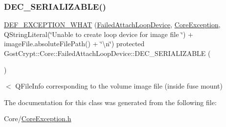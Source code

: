 \subsubsection{\texorpdfstring{D\+E\+C\+\_\+\+S\+E\+R\+I\+A\+L\+I\+Z\+A\+B\+L\+E()}{DEC\_SERIALIZABLE()}}
{\footnotesize\ttfamily \hyperlink{_gost_crypt_exception_8h_a5bc1e1c6c9d6f46c84eeba49e33355f9}{D\+E\+F\+\_\+\+E\+X\+C\+E\+P\+T\+I\+O\+N\+\_\+\+W\+H\+AT} (\hyperlink{class_gost_crypt_1_1_core_1_1_failed_attach_loop_device}{Failed\+Attach\+Loop\+Device}, \hyperlink{class_gost_crypt_1_1_core_1_1_core_exception}{Core\+Exception}, Q\+String\+Literal(\char`\"{}Unable to create loop device for image file \char`\"{}) + image\+File.\+absolute\+File\+Path() + \char`\"{}\textbackslash{}n\char`\"{}) protected Gost\+Crypt\+::\+Core\+::\+Failed\+Attach\+Loop\+Device\+::\+D\+E\+C\+\_\+\+S\+E\+R\+I\+A\+L\+I\+Z\+A\+B\+LE (\begin{DoxyParamCaption}\item[{\hyperlink{class_gost_crypt_1_1_core_1_1_failed_attach_loop_device}{Failed\+Attach\+Loop\+Device}}]{ }\end{DoxyParamCaption})}

$<$ Q\+File\+Info corresponding to the volume image file (inside fuse mount) 

The documentation for this class was generated from the following file\+:\begin{DoxyCompactItemize}
\item 
Core/\hyperlink{_core_exception_8h}{Core\+Exception.\+h}\end{DoxyCompactItemize}
